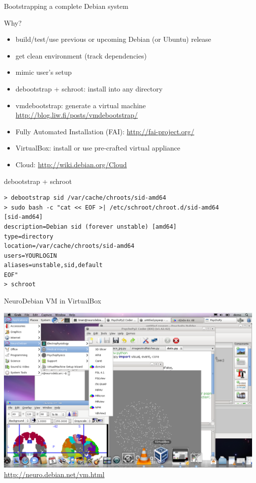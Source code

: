 \documentclass[]{beamer}
\begin{document}
\begin{frame}[fragile]{Bootstrapping a complete Debian system}
\begin{block}{Why?}
  \begin{itemize}
  \item build/test/use previous or upcoming Debian (or Ubuntu) release
  \item get clean environment (track dependencies)
  \item mimic user's setup
  \end{itemize}
\end{block}
\begin{itemize}
\item<2-> debootstrap + schroot: install into any directory
\item<2-> vmdebootstrap: generate a virtual machine\\
  \url{http://blog.liw.fi/posts/vmdebootstrap/}
\item<2-> Fully Automated Installation (FAI): \url{http://fai-project.org/}
\item<2-> VirtualBox: install or use pre-crafted virtual appliance
\item<2-> Cloud: \url{http://wiki.debian.org/Cloud}
\end{itemize}
\end{frame}

\begin{frame}[fragile]{debootstrap + schroot}
\begin{verbatim}
> debootstrap sid /var/cache/chroots/sid-amd64
> sudo bash -c "cat << EOF >| /etc/schroot/chroot.d/sid-amd64
[sid-amd64]
description=Debian sid (forever unstable) [amd64]
type=directory
location=/var/cache/chroots/sid-amd64
users=YOURLOGIN
aliases=unstable,sid,default
EOF"
> schroot
\end{verbatim}
\end{frame}

\begin{frame}{NeuroDebian VM in VirtualBox}
  \begin{center}
    \includegraphics[width=\linewidth]{ndshot-vm-osx+psychopy}\\
  \url{http://neuro.debian.net/vm.html}
\end{center}
\end{frame}
\end{document}
